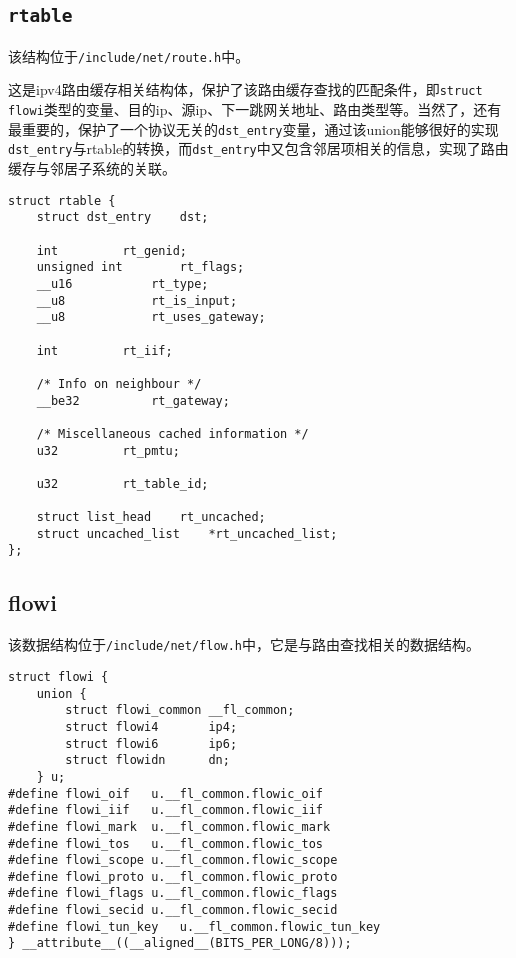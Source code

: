         \subsection{\texttt{rtable}}

            该结构位于\texttt{/include/net/route.h}中。

            这是ipv4路由缓存相关结构体，保护了该路由缓存查找的匹配条件，即\texttt{struct flowi}类型的变量、目的ip、源ip、下一跳网关地址、路由类型等。当然了，还有最重要的，保护了一个协议无关的\texttt{dst_entry}变量，通过该union能够很好的实现\texttt{dst_entry}与rtable的转换，而\texttt{dst_entry}中又包含邻居项相关的信息，实现了路由缓存与邻居子系统的关联。

\begin{verbatim}
struct rtable {
    struct dst_entry    dst;

    int         rt_genid;
    unsigned int        rt_flags;
    __u16           rt_type;
    __u8            rt_is_input;
    __u8            rt_uses_gateway;

    int         rt_iif;

    /* Info on neighbour */
    __be32          rt_gateway;

    /* Miscellaneous cached information */
    u32         rt_pmtu;

    u32         rt_table_id;

    struct list_head    rt_uncached;
    struct uncached_list    *rt_uncached_list;
};
\end{verbatim}

        \subsection{flowi}

            该数据结构位于\texttt{/include/net/flow.h}中，它是与路由查找相关的数据结构。
\begin{verbatim}
struct flowi {
    union {
        struct flowi_common __fl_common;
        struct flowi4       ip4;
        struct flowi6       ip6;
        struct flowidn      dn;
    } u;
#define flowi_oif   u.__fl_common.flowic_oif
#define flowi_iif   u.__fl_common.flowic_iif
#define flowi_mark  u.__fl_common.flowic_mark
#define flowi_tos   u.__fl_common.flowic_tos
#define flowi_scope u.__fl_common.flowic_scope
#define flowi_proto u.__fl_common.flowic_proto
#define flowi_flags u.__fl_common.flowic_flags
#define flowi_secid u.__fl_common.flowic_secid
#define flowi_tun_key   u.__fl_common.flowic_tun_key
} __attribute__((__aligned__(BITS_PER_LONG/8)));
\end{verbatim}
